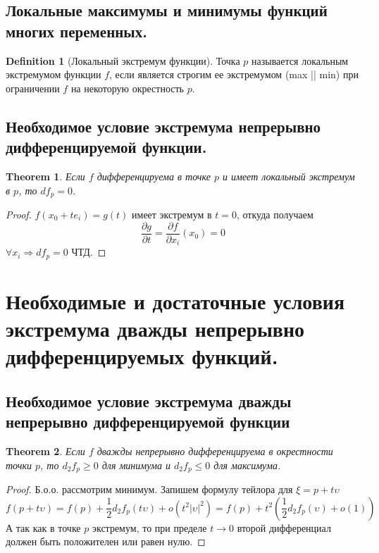 \documentclass[a4paper,12pt]{article} %
\newtheorem{theorem}{Theorem}
\theoremstyle{definition}
\newtheorem{definition}{Definition}[section]
\begin{document}
\subsection{Локальные максимумы и минимумы функций многих переменных.}
\begin{definition}[Локальный экстремум функции]
	Точка $p$ называется локальным экстремумом функции $f$, если является строгим ее экстремумом (max || min) при ограничении $f$ на некоторую окрестность $p$.
\end{definition}
\subsection{Необходимое условие экстремума непрерывно дифференцируемой функции.}
\begin{theorem}
	Если $f$ дифференцируема в точке $p$ и имеет локальный экстремум в $p$, то $df_p = 0$.
\end{theorem}
\begin{proof}
	$f(x_0 + t e_i) = g(t)$ имеет экстремум в $t = 0$, откуда получаем
	\begin{equation}
		\frac{\partial g}{\partial t} = \frac{\partial f}{\partial x_i}(x_0) = 0
	\end{equation}
	$\forall x_i \Rightarrow df_p = 0$ ЧТД.
\end{proof}
\section{Необходимые и достаточные условия экстремума дважды непрерывно дифференцируемых функций.}
\subsection{Необходимое условие экстремума дважды непрерывно дифференцируемой функции}
\begin{theorem}
	Если $f$ дважды непрерывно дифференцируема в окрестности точки $p$, то $d_2 f_p \geq 0$ для минимума и $d_2 f_p \leq 0$ для максимума. 
\end{theorem}
\begin{proof}
	Б.о.о. рассмотрим минимум. Запишем формулу тейлора для $\xi = p + t \upsilon$
	\begin{equation}
		f(p+t\upsilon) = f(p) + \frac{1}{2} d_2 f_p(t \upsilon) + o(t^2 |\upsilon|^2) = f(p) + t^2(\frac{1}{2} d_2 f_p(\upsilon) + o(1))
	\end{equation}
	А так как в точке $p$ экстремум, то при пределе $t \rightarrow 0$ второй дифференциал должен быть положителен или равен нулю.
\end{proof}
\end{document}
